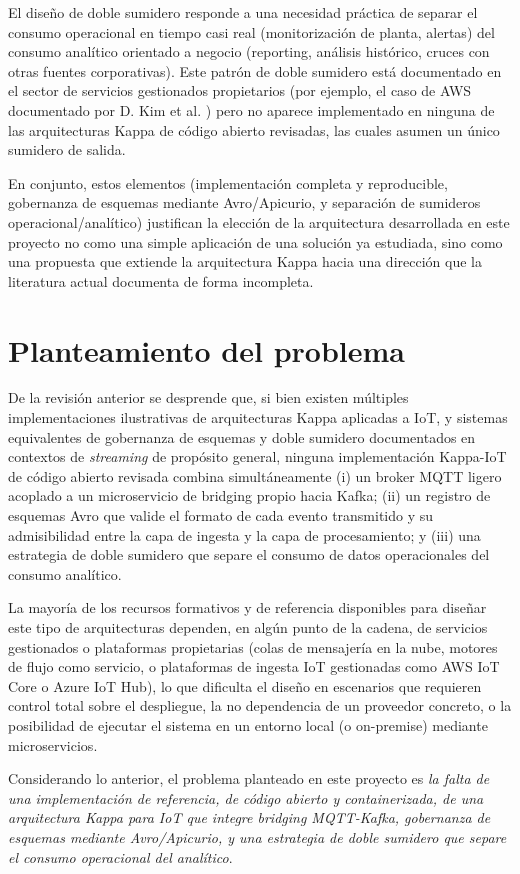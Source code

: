 El diseño de doble sumidero responde a una necesidad práctica de separar el consumo operacional en tiempo casi real (monitorización de planta, alertas) del consumo analítico orientado a negocio (reporting, análisis histórico, cruces con otras fuentes corporativas). Este patrón de doble sumidero está documentado en el sector de servicios gestionados propietarios (por ejemplo, el caso de AWS documentado por D. Kim et al. \cite{kimetal2022}) pero no aparece implementado en ninguna de las arquitecturas Kappa de código abierto revisadas, las cuales asumen un único sumidero de salida.

En conjunto, estos elementos (implementación completa y reproducible, gobernanza de esquemas mediante Avro/Apicurio, y separación de sumideros operacional/analítico) justifican la elección de la arquitectura desarrollada en este proyecto no como una simple aplicación de una solución ya estudiada, sino como una propuesta que extiende la arquitectura Kappa hacia una dirección que la literatura actual documenta de forma incompleta.

\section{Planteamiento del problema}

De la revisión anterior se desprende que, si bien existen múltiples implementaciones ilustrativas de arquitecturas Kappa aplicadas a IoT, y sistemas equivalentes de gobernanza de esquemas y doble sumidero documentados en contextos de \textit{streaming} de propósito general, ninguna implementación Kappa-IoT de código abierto revisada combina simultáneamente (i) un broker MQTT ligero acoplado a un microservicio de bridging propio hacia Kafka; (ii) un registro de esquemas Avro que valide el formato de cada evento transmitido y su admisibilidad entre la capa de ingesta y la capa de procesamiento; y (iii) una estrategia de doble sumidero que separe el consumo de datos operacionales del consumo analítico.

La mayoría de los recursos formativos y de referencia disponibles para diseñar este tipo de arquitecturas dependen, en algún punto de la cadena, de servicios gestionados o plataformas propietarias (colas de mensajería en la nube, motores de flujo como servicio, o plataformas de ingesta IoT gestionadas como AWS IoT Core o Azure IoT Hub), lo que dificulta el diseño en escenarios que requieren control total sobre el despliegue, la no dependencia de un proveedor concreto, o la posibilidad de ejecutar el sistema en un entorno local (o on-premise) mediante microservicios.

Considerando lo anterior, el problema planteado en este proyecto es \textit{la falta de una implementación de referencia, de código abierto y containerizada, de una arquitectura Kappa para IoT que integre bridging MQTT-Kafka, gobernanza de esquemas mediante Avro/Apicurio, y una estrategia de doble sumidero que separe el consumo operacional del analítico}.
